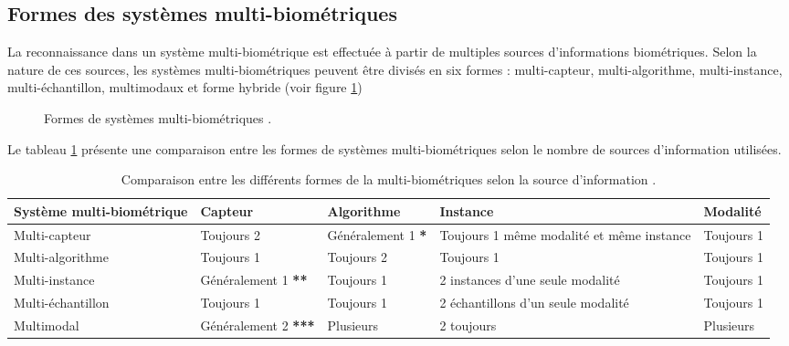 \subsection{Formes des systèmes multi-biométriques}

La reconnaissance dans un système multi-biométrique est effectuée à partir de multiples sources d'informations biométriques. Selon la nature de ces sources, les systèmes multi-biométriques peuvent être divisés en six formes \citep{ross2008introduction} : multi-capteur, multi-algorithme, multi-instance, multi-échantillon, multimodaux et forme hybride (voir figure \ref{fig:chapitre1sysmultibio})
\begin{center}
	\begin{figure}[H]
		\centering
		\caption{Formes de systèmes multi-biométriques \citep{jain2007technology}.}
		\label{fig:chapitre1sysmultibio}
	\end{figure}
\end{center}

Le tableau \ref{tab:comparaisonFormes} présente une comparaison entre les formes de systèmes multi-biométriques selon le nombre de sources d'information utilisées.
\begin{table}[H]
	\centering
	
	
	\begin{tabular}{|p{3cm}|p{3.2cm}|p{3.2cm}|p{4cm}|p{2cm}|}
		
		\hline
		
		\centering\textbf{Système multi-biométrique }
		& \centering	\textbf{Capteur}
		& \centering \textbf{Algorithme}
		& \centering \textbf{Instance} 
		& \textbf{Modalité} \\ \hline
		Multi-capteur&Toujours 2 &Généralement 1 \textbf{*}&Toujours 1 même modalité et même instance&Toujours 1\\ \hline
		Multi-algorithme&Toujours 1 &Toujours 2 &Toujours 1 &Toujours 1 \\ \hline
		Multi-instance&Généralement 1 \textbf{**}&Toujours 1 &2 instances d'une seule modalité&Toujours 1 \\ \hline
		Multi-échantillon&Toujours 1 &Toujours 1 &2 échantillons d'un seule modalité&Toujours 1 \\ \hline
		Multimodal&Généralement 2 \textbf{***}&Plusieurs&2 toujours&Plusieurs \\ \hline
	\end{tabular}
	\caption{Comparaison entre les différents formes de la multi-biométriques selon la source d'information \citep{dhamala2012multibiometric}.}	
	\label{tab:comparaisonFormes}
\end{table} 

